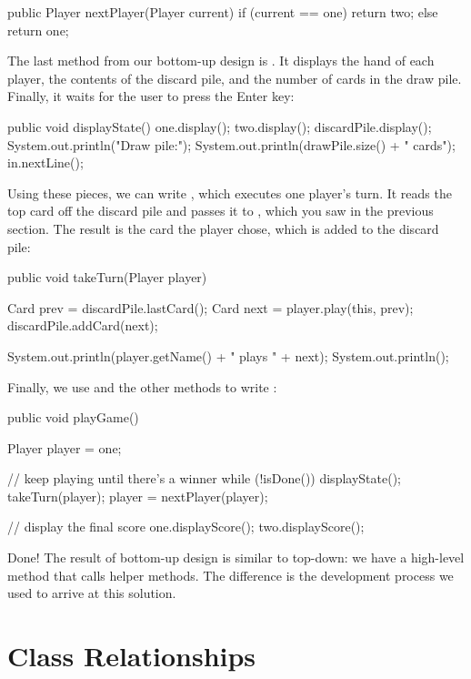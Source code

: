 \begin{code}
public Player nextPlayer(Player current) {
    if (current == one) {
        return two;
    } else {
        return one;
    }
}
\end{code}

The last method from our bottom-up design is .
It displays the hand of each player, the contents of the discard pile, and the number of cards in the draw pile.
Finally, it waits for the user to press the {\sf Enter} key:

\begin{code}
public void displayState() {
    one.display();
    two.display();
    discardPile.display();
    System.out.println("Draw pile:");
    System.out.println(drawPile.size() + " cards");
    in.nextLine();
}
\end{code}

Using these pieces, we can write , which executes one player's turn.
It reads the top card off the discard pile and passes it to , which you saw in the previous section.
The result is the card the player chose, which is added to the discard pile:

\begin{code}
public void takeTurn(Player player) {
    Card prev = discardPile.lastCard();
    Card next = player.play(this, prev);
    discardPile.addCard(next);

    System.out.println(player.getName() + " plays " + next);
    System.out.println();
}
\end{code}

Finally, we use  and the other methods to write :

\begin{code}
public void playGame() {
    Player player = one;

    // keep playing until there's a winner
    while (!isDone()) {
        displayState();
        takeTurn(player);
        player = nextPlayer(player);
    }

    // display the final score
    one.displayScore();
    two.displayScore();
}
\end{code}

Done!
The result of bottom-up design is similar to top-down: we have a high-level method that calls helper methods.
The difference is the development process we used to arrive at this solution.


\section{Class Relationships}
\label{extending-classes_class-relationships}

